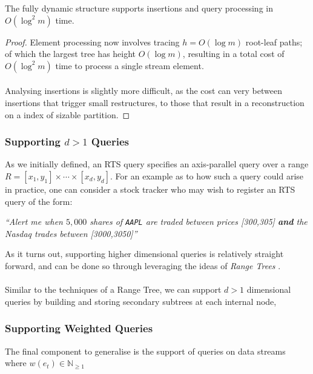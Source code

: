 \begin{lemma}
    The fully dynamic structure supports insertions and query processing in $O(\log^2 m)$ time.
\end{lemma}
\begin{proof}
    Element processing now involves tracing $h = O(\log m)$ root-leaf paths; of which the largest tree has height $O(\log m)$, resulting in a total cost of $O(\log^2 m)$ time to process a single stream element. \\
    \\
    Analysing insertions is slightly more difficult, as the cost can very between insertions that trigger small restructures, to those that result in a reconstruction on a index of sizable partition.
\end{proof}

\subsubsection*{Supporting $d>1$ Queries} 

As we initially defined, an RTS query specifies an axis-parallel query over a range $R = [x_1, y_1] \times \cdots \times [x_d, y_d]$. For an example as to how such a query could arise in practice, one can consider a stock tracker who may wish to register an RTS query of the form: 

\begin{center}
    \textit{``Alert me when $5,000$ shares of \texttt{AAPL} are traded between prices [300,305] \textbf{and} the Nasdaq trades between [3000,3050]''}
\end{center}
As it turns out, supporting higher dimensional queries is relatively straight forward, and can be done so through leveraging the ideas of \textit{Range Trees} \cite{RTrees, DeBerg}. \\ 
\\
Similar to the techniques of a Range Tree, we can support  $d>1$ dimensional queries by building and storing secondary subtrees at each internal node, 


\subsubsection*{Supporting Weighted Queries}
The final component to generalise is the support of queries on data streams where $w(e_t) \in \mathbb{N}_{\geq1}$


